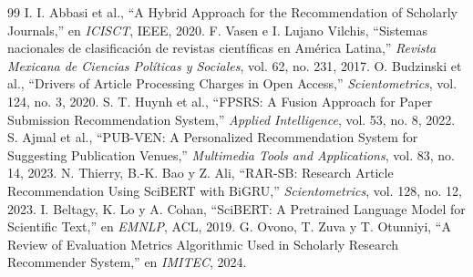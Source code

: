 \documentclass[12pt,a4paper]{article}
\begin{document}
\begin{thebibliography}{99}
 I. I. Abbasi et al., ``A Hybrid Approach for the Recommendation of Scholarly Journals,'' en \emph{ICISCT}, IEEE, 2020.
 F. Vasen e I. Lujano Vilchis, ``Sistemas nacionales de clasificación de revistas científicas en América Latina,'' \emph{Revista Mexicana de Ciencias Políticas y Sociales}, vol. 62, no. 231, 2017.
 O. Budzinski et al., ``Drivers of Article Processing Charges in Open Access,'' \emph{Scientometrics}, vol. 124, no. 3, 2020.
 S. T. Huynh et al., ``FPSRS: A Fusion Approach for Paper Submission Recommendation System,'' \emph{Applied Intelligence}, vol. 53, no. 8, 2022.
 S. Ajmal et al., ``PUB-VEN: A Personalized Recommendation System for Suggesting Publication Venues,'' \emph{Multimedia Tools and Applications}, vol. 83, no. 14, 2023.
 N. Thierry, B.-K. Bao y Z. Ali, ``RAR-SB: Research Article Recommendation Using SciBERT with BiGRU,'' \emph{Scientometrics}, vol. 128, no. 12, 2023.
 I. Beltagy, K. Lo y A. Cohan, ``SciBERT: A Pretrained Language Model for Scientific Text,'' en \emph{EMNLP}, ACL, 2019.
 G. Ovono, T. Zuva y T. Otunniyi, ``A Review of Evaluation Metrics Algorithmic Used in Scholarly Research Recommender System,'' en \emph{IMITEC}, 2024.
\end{thebibliography}
\end{document}
